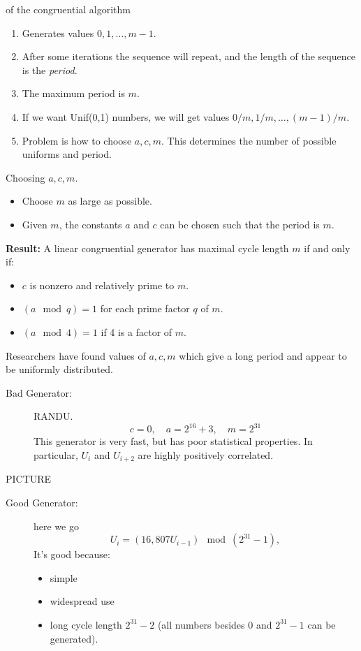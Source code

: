 \documentclass[captions=tableheading]{scrbook}
\begin{document}
\begin{description}
\item[Properties:] of the congruential algorithm
\begin{enumerate}
\item Generates values $0,1,\ldots,m-1$.
\item After some iterations the sequence will repeat, and the length of the sequence is the \emph{period}.
\item The maximum period is $m$.
\item If we want Unif(0,1) numbers, we will get values $0/m,1/m,\ldots,(m-1)/m$.
\item Problem is how to choose $a,c,m$. This determines the number of possible uniforms and period.
\end{enumerate}
\item[NUMBER THEORY RESULTS:] Choosing $a,c,m$.
\begin{itemize}
\item Choose $m$ as large as possible.
\item Given $m$, the constants $a$ and $c$ can be chosen such that the period is $m$.
\end{itemize}
\item\textbf{Result:} A linear congruential generator has maximal cycle length $m$ if and only if:
\begin{itemize}
\item $c$ is nonzero and relatively prime to $m$.
\item \( (a \mod q) = 1 \) for each prime factor $q$ of $m$.
\item \( (a \mod 4) = 1 \) if 4 is a factor of $m$.
\end{itemize}
\end{description}

Researchers have found values of $a,c,m$ which give a long period and appear to be uniformly distributed.


\begin{description}
\item[Bad Generator:] RANDU.  
  \[
  c = 0,\quad a=2^{16}+3,\quad m=2^{31}
  \]
  This generator is very fast, but has poor statistical properties. In particular, $U_{i}$ and $U_{i+2}$ are highly positively correlated.
\end{description}
PICTURE 

\vspace{1in}


\begin{description}
\item[Good Generator:] here we go   
  \[
  U_{i}=(16,807U_{i-1})\mod(2^{31}-1),
  \]
  It's good because:
\begin{itemize}
\item simple
\item widespread use
\item long cycle length $2^{31}-2$ (all numbers besides 0 and $2^{31}-1$ can be generated).
\end{itemize}
\end{description}
\end{document}
